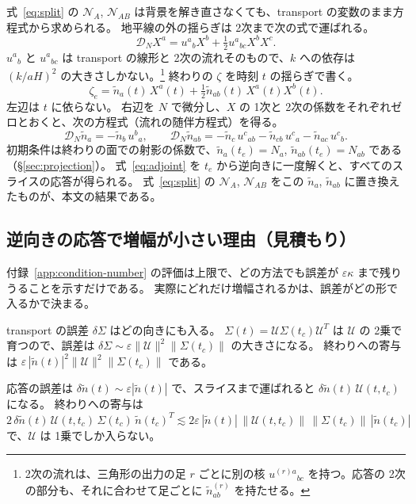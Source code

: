 \documentclass[a4paper,11pt]{ltjsarticle}
\newcommand{\DN}{\mathcal{D}_N}
\begin{document}
式~\eqref{eq:split} の $\mathcal N_A$, $\mathcal N_{AB}$ は背景を解き直さなくても、transport の変数のまま方程式から求められる。
地平線の外の揺らぎは 2次まで次の式で運ばれる。
\begin{equation}
\DN X^a=u^a{}_bX^b+\tfrac12u^a{}_{bc}X^bX^c .
\end{equation}
$u^a{}_b$ と $u^a{}_{bc}$ は transport の線形と 2次の流れそのもので、$k$ への依存は $(k/aH)^2$ の大きさしかない。\footnote{%
2次の流れは、三角形の出力の足 $r$ ごとに別の核 $u^{(r)a}{}_{bc}$ を持つ。応答の 2次の部分も、それに合わせて足ごとに $\tilde n^{(r)}_{ab}$ を持たせる。}
終わりの $\zeta$ を時刻 $t$ の揺らぎで書く。
\begin{equation}
\zeta_e=\tilde n_a(t)\,X^a(t)+\tfrac12\tilde n_{ab}(t)\,X^a(t)X^b(t) .
\end{equation}
左辺は $t$ に依らない。
右辺を $N$ で微分し、$X$ の 1次と 2次の係数をそれぞれゼロとおくと、次の方程式（流れの随伴方程式）を得る。
\begin{equation}
\DN\tilde n_a=-\tilde n_b\,u^b{}_a,\qquad
\DN\tilde n_{ab}=-\tilde n_c\,u^c{}_{ab}-\tilde n_{cb}\,u^c{}_a-\tilde n_{ac}\,u^c{}_b .
\label{eq:adjoint}
\end{equation}
初期条件は終わりの面での射影の係数で、$\tilde n_a(t_e)=N_a$, $\tilde n_{ab}(t_e)=N_{ab}$ である（\S\ref{sec:projection}）。
式~\eqref{eq:adjoint} を $t_e$ から逆向きに一度解くと、すべてのスライスの応答が得られる。
式~\eqref{eq:split} の $\mathcal N_A$, $\mathcal N_{AB}$ をこの $\tilde n_a$, $\tilde n_{ab}$ に置き換えたものが、本文の結果である。

\subsection{逆向きの応答で増幅が小さい理由（見積もり）}

付録~\ref{app:condition-number} の評価は上限で、どの方法でも誤差が $\varepsilon\kappa$ まで残りうることを示すだけである。
実際にどれだけ増幅されるかは、誤差がどの形で入るかで決まる。

transport の誤差 $\delta\Sigma$ はどの向きにも入る。
$\Sigma(t)=\mathcal U\Sigma(t_c)\mathcal U^T$ は $\mathcal U$ の 2乗で育つので、誤差は $\delta\Sigma\sim\varepsilon\|\mathcal U\|^2\|\Sigma(t_c)\|$ の大きさになる。
終わりへの寄与は $\varepsilon\,|\tilde n(t)|^2\|\mathcal U\|^2\|\Sigma(t_c)\|$ である。

応答の誤差は $\delta\tilde n(t)\sim\varepsilon|\tilde n(t)|$ で、スライスまで運ばれると $\delta\tilde n(t)\,\mathcal U(t,t_c)$ になる。
終わりへの寄与は
\[
2\,\delta\tilde n(t)\,\mathcal U(t,t_c)\,\Sigma(t_c)\,\tilde n(t_c)^T\lesssim2\varepsilon\,|\tilde n(t)|\,\|\mathcal U(t,t_c)\|\,\|\Sigma(t_c)\|\,|\tilde n(t_c)|
\]
で、$\mathcal U$ は 1乗でしか入らない。
\end{document}
